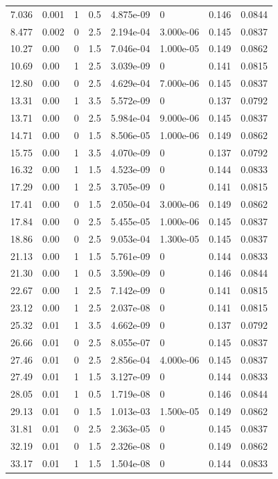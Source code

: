 \documentclass[preview]{standalone}
\begin{document}
{{\begin{tabular}{L{1.2cm}C{1.2cm} C{0.3cm}C{0.5cm} C{1.4cm}C{1.4cm} C{1.4cm}C{1.4cm}}
  7.036  &  0.001  & 1     & 0.5 &  4.875e-09  & 0  & 0.146 &  0.0844   \\ 
  8.477  &  0.002  & 0     & 2.5 &  2.194e-04  & 3.000e-06  & 0.145 &  0.0837   \\ 
  10.27  &  0.00  & 0     & 1.5 &  7.046e-04  & 1.000e-05  & 0.149 &  0.0862   \\ 
  10.69  &  0.00  & 1     & 2.5 &  3.039e-09  & 0  & 0.141 &  0.0815   \\ 
  12.80  &  0.00  & 0     & 2.5 &  4.629e-04  & 7.000e-06  & 0.145 &  0.0837   \\ 
  13.31  &  0.00  & 1     & 3.5 &  5.572e-09  & 0  & 0.137 &  0.0792   \\ 
  13.71  &  0.00  & 0     & 2.5 &  5.984e-04  & 9.000e-06  & 0.145 &  0.0837   \\ 
  14.71  &  0.00  & 0     & 1.5 &  8.506e-05  & 1.000e-06  & 0.149 &  0.0862   \\ 
  15.75  &  0.00  & 1     & 3.5 &  4.070e-09  & 0  & 0.137 &  0.0792   \\ 
  16.32  &  0.00  & 1     & 1.5 &  4.523e-09  & 0  & 0.144 &  0.0833   \\ 
  17.29  &  0.00  & 1     & 2.5 &  3.705e-09  & 0  & 0.141 &  0.0815   \\ 
  17.41  &  0.00  & 0     & 1.5 &  2.050e-04  & 3.000e-06  & 0.149 &  0.0862   \\ 
  17.84  &  0.00  & 0     & 2.5 &  5.455e-05  & 1.000e-06  & 0.145 &  0.0837   \\ 
  18.86  &  0.00  & 0     & 2.5 &  9.053e-04  & 1.300e-05  & 0.145 &  0.0837   \\ 
  21.13  &  0.00  & 1     & 1.5 &  5.761e-09  & 0  & 0.144 &  0.0833   \\ 
  21.30  &  0.00  & 1     & 0.5 &  3.590e-09  & 0  & 0.146 &  0.0844   \\ 
  22.67  &  0.00  & 1     & 2.5 &  7.142e-09  & 0  & 0.141 &  0.0815   \\ 
  23.12  &  0.00  & 1     & 2.5 &  2.037e-08  & 0  & 0.141 &  0.0815   \\ 
  25.32  &  0.01  & 1     & 3.5 &  4.662e-09  & 0  & 0.137 &  0.0792   \\ 
  26.66  &  0.01  & 0     & 2.5 &  8.055e-07  & 0  & 0.145 &  0.0837   \\ 
  27.46  &  0.01  & 0     & 2.5 &  2.856e-04  & 4.000e-06  & 0.145 &  0.0837   \\ 
  27.49  &  0.01  & 1     & 1.5 &  3.127e-09  & 0  & 0.144 &  0.0833   \\ 
  28.05  &  0.01  & 1     & 0.5 &  1.719e-08  & 0  & 0.146 &  0.0844   \\ 
  29.13  &  0.01  & 0     & 1.5 &  1.013e-03  & 1.500e-05  & 0.149 &  0.0862   \\ 
  31.81  &  0.01  & 0     & 2.5 &  2.363e-05  & 0  & 0.145 &  0.0837   \\ 
  32.19  &  0.01  & 0     & 1.5 &  2.326e-08  & 0  & 0.149 &  0.0862   \\ 
  33.17  &  0.01  & 1     & 1.5 &  1.504e-08  & 0  & 0.144 &  0.0833   \\ 
\hline 
\end{tabular} 

}}
\end{document}
